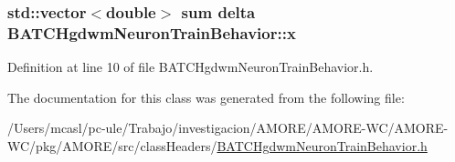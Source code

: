 \hypertarget{class_b_a_t_c_hgdwm_neuron_train_behavior_ae6e7df3f35d52af0f285a9ec35e946f6}{
\subsubsection[{x}]{\setlength{\rightskip}{0pt plus 5cm}std::vector$<$double$>$ sum {\bf delta} {\bf BATCHgdwmNeuronTrainBehavior::x}}}
\label{class_b_a_t_c_hgdwm_neuron_train_behavior_ae6e7df3f35d52af0f285a9ec35e946f6}


Definition at line 10 of file BATCHgdwmNeuronTrainBehavior.h.



The documentation for this class was generated from the following file:\begin{DoxyCompactItemize}
\item 
/Users/mcasl/pc-\/ule/Trabajo/investigacion/AMORE/AMORE-\/WC/AMORE-\/WC/pkg/AMORE/src/classHeaders/\hyperlink{_b_a_t_c_hgdwm_neuron_train_behavior_8h}{BATCHgdwmNeuronTrainBehavior.h}\end{DoxyCompactItemize}
